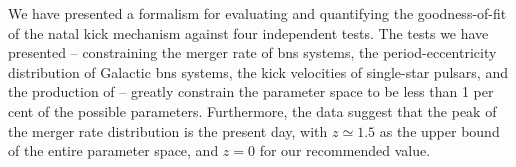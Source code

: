 We have presented a formalism for evaluating and quantifying the goodness-of-fit of the natal kick mechanism against four independent tests. The tests we have presented -- constraining the merger rate of \gls{bns} systems, the period-eccentricity distribution of Galactic \gls{bns} systems, the kick velocities of single-star pulsars, and the production of  -- greatly constrain the parameter space to be less than 1 per cent of the possible parameters. Furthermore, the data suggest that the peak of the merger rate distribution is the present day, with $z\simeq 1.5$ as the upper bound of the entire parameter space, and $z=0$ for our recommended value.

